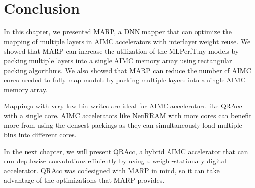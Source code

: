 \section{Conclusion}

In this chapter, we presented MARP, a DNN mapper that can optimize the mapping of multiple layers in AIMC accelerators with interlayer weight reuse. We showed that MARP can increase the utilization of the MLPerfTiny models by packing multiple layers into a single AIMC memory array using rectangular packing algorithms. We also showed that MARP can reduce the number of AIMC cores needed to fully map models by packing multiple layers into a single AIMC memory array.

Mappings with very low bin writes are ideal for AIMC accelerators like QRAcc with a single core. AIMC accelerators like NeuRRAM with more cores can benefit more from using the densest packings as they can simultaneously load multiple bins into different cores. 

In the next chapter, we will present QRAcc, a hybrid AIMC accelerator that can run depthwise convolutions efficiently by using a weight-stationary digital accelerator. QRAcc was codesigned with MARP in mind, so it can take advantage of the optimizations that MARP provides.